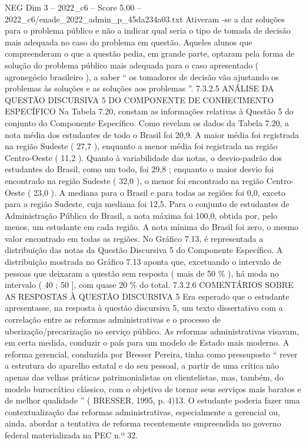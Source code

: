 \begin{textsample}{NEG Dim 3 – 2022\_c6 – Score 5.00 – 2022\_c6/enade\_2022\_admin\_p\_45da234a03.txt}
Ativeram -se a dar soluções para o problema público e não a indicar qual seria o tipo de tomada de decisão mais adequada no caso do problema em questão.
Aqueles alunos que compreenderam o que a questão pedia, em grande parte, optaram pela forma de solução do problema público mais adequada para o caso apresentado ( agronegócio brasileiro ), a saber “ os tomadores de decisão vão ajustando os problemas às soluções e as soluções aos problemas ”. 7.3.2.5 ANÁLISE DA QUESTÃO DISCURSIVA 5 DO COMPONENTE DE CONHECIMENTO ESPECÍFICO Na Tabela 7.20, constam as informações relativas à Questão 5 do conjunto do Componente Específico.
Como revelam os dados da Tabela 7.20, a nota média dos estudantes de todo o Brasil foi 20,9.
A maior média foi registrada na região Sudeste ( 27,7 ), enquanto a menor média foi registrada na região Centro-Oeste ( 11,2 ).
Quanto à variabilidade das notas, o desvio-padrão dos estudantes do Brasil, como um todo, foi 29,8 ; enquanto o maior desvio foi encontrado na região Sudeste ( 32,0 ), o menor foi encontrado na região Centro-Oeste ( 23,0 ).
A mediana para o Brasil e para todas as regiões foi 0,0, exceto para a região Sudeste, cuja mediana foi 12,5.
Para o conjunto de estudantes de Administração Pública do Brasil, a nota máxima foi 100,0, obtida por, pelo menos, um estudante em cada região.
A nota mínima do Brasil foi zero, o mesmo valor encontrado em todas as regiões.
No Gráfico 7.13, é representada a distribuição das notas da Questão Discursiva 5 do Componente Específico.
A distribuição mostrada no Gráfico 7.13 aponta que, excetuando o intervalo de pessoas que deixaram a questão sem resposta ( mais de 50 \% ), há moda no intervalo ( 40 ; 50 ], com quase 20 \% do total. 7.3.2.6 COMENTÁRIOS SOBRE AS RESPOSTAS À QUESTÃO DISCURSIVA 5 Era esperado que o estudante apresentasse, na resposta à questão discursiva 5, um texto dissertativo com a correlação entre as reformas administrativas e o processo de uberização/precarização no serviço público.
As reformas administrativas visavam, em certa medida, conduzir o país para um modelo de Estado mais moderno.
A reforma gerencial, conduzida por Bresser Pereira, tinha como pressuposto “ rever a estrutura do aparelho estatal e do seu pessoal, a partir de uma crítica não apenas das velhas práticas patrimonialistas ou clientelistas, mas, também, do modelo burocrático clássico, com o objetivo de tornar seus serviços mais baratos e de melhor qualidade ” ( BRESSER, 1995, p. 4)13.
O estudante poderia fazer uma contextualização das reformas administrativas, especialmente a gerencial ou, ainda, abordar a tentativa de reforma recentemente empreendida no governo federal materializada na PEC n.º 32.

\end{textsample}
